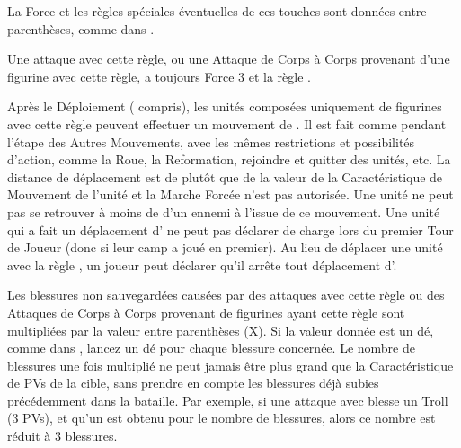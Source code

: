  La Force et les règles spéciales éventuelles de ces touches sont données entre parenthèses, comme dans \og {} \fg{}.


Une attaque avec cette règle, ou une Attaque de Corps à Corps provenant d'une figurine avec cette règle, a toujours Force 3 et la règle .

\newpage
{}

Après le Déploiement (\scouts{} compris), les unités composées uniquement de figurines avec cette règle peuvent effectuer un mouvement de . Il est fait comme pendant l'étape des Autres Mouvements, avec les mêmes restrictions et possibilités d'action, comme la Roue, la Reformation, rejoindre et quitter des unités, etc. La distance de déplacement est de  plutôt que de la valeur de la Caractéristique de Mouvement de l'unité et la Marche Forcée n'est pas autorisée. Une unité ne peut pas se retrouver à moins de  d'un ennemi à l'issue de ce mouvement.  Une unité qui a fait un déplacement d'\vanguard{} ne peut pas déclarer de charge lors du premier Tour de Joueur (donc si leur camp a joué en premier).  Au lieu de déplacer une unité avec la règle \vanguard{}, un joueur peut déclarer qu'il arrête tout déplacement d'\vanguard{}.


Les blessures non sauvegardées causées par des attaques avec cette règle ou des Attaques de Corps à Corps provenant de figurines ayant cette règle sont multipliées par la valeur entre parenthèses (X). Si la valeur donnée est un dé, comme dans \og {} \fg{}, lancez un dé pour chaque blessure concernée. Le nombre de blessures une fois multiplié ne peut jamais être plus grand que la Caractéristique de PVs de la cible, sans prendre en compte les blessures déjà subies précédemment dans la bataille. Par exemple, si une attaque avec  blesse un Troll (3 PVs), et qu'un  est obtenu pour le nombre de blessures, alors ce nombre est réduit à 3 blessures.

